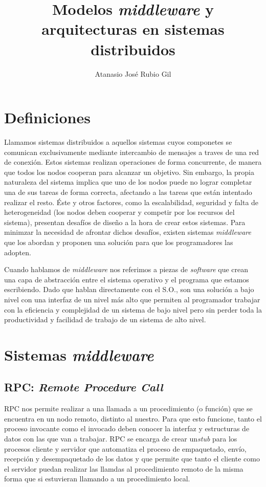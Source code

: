 \documentclass[runningheads]{llncs}
\title{Modelos \textit{middleware} y arquitecturas en sistemas distribuidos}
\author{Atanasio José Rubio Gil}
\institute{Universidad de Granada, 18010 Granada, España}
\begin{document}
\maketitle

\begin{center}
\end{center}

\section{Definiciones}

Llamamos sistemas distribuidos a aquellos sistemas cuyos componetes se comunican exclusivamente mediante intercambio de mensajes a traves de una red de conexión.
Estos sistemas realizan operaciones de forma concurrente, de manera que todos los nodos cooperan para alcanzar un objetivo.
Sin embargo, la propia naturaleza del sistema implica que uno de los nodos puede no lograr completar una de sus tareas de forma correcta, afectando a las tareas que están intentado realizar el resto.
Éste y otros factores, como la escalabilidad, seguridad y falta de heterogeneidad (los nodos deben cooperar y competir por los recursos del sistema), presentan desafíos de diseño a la hora de crear estos sistemas.
Para minimzar la necesidad de afrontar dichos desafíos, existen sistemas \textit{middleware} que los abordan y proponen una solución para que los programadores las adopten.

Cuando hablamos de \textit{middleware} nos referimos a piezas de \textit{software} que crean una capa de abstracción entre el sistema operativo y el programa que estamos escribiendo.
Dado que hablan directamente con el S.O., son una solución a bajo nivel con una interfaz de un nivel más alto que permiten al programador trabajar con la eficiencia y complejidad de un sistema de bajo nivel pero sin perder toda la productividad y facilidad de trabajo de un sistema de alto nivel.

\section{Sistemas \textit{middleware}}

\subsection{RPC\@: \textit{Remote Procedure Call}}

RPC nos permite realizar a una llamada a un procedimiento (o función) que se encuentra en un nodo remoto, distinto al nuestro.
Para que esto funcione, tanto el proceso invocante como el invocado deben conocer la interfaz y estructuras de datos con las que van a trabajar.
RPC se encarga de crear un\textit{stub} para los procesos cliente y servidor que automatiza el proceso de empaquetado, envío, recepción y desempaquetado de los datos y que permite que tanto el cliente como el servidor puedan realizar las llamdas al procedimiento remoto de la misma forma que si estuvieran llamando a un procedimiento local.
\end{document}
